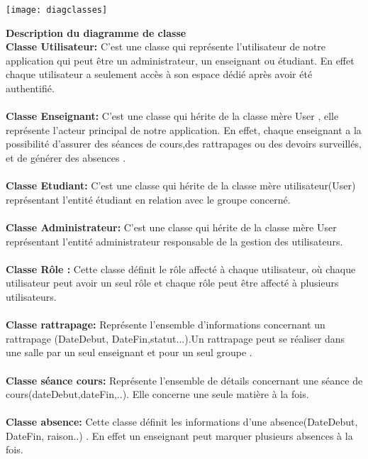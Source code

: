 \documentclass[a4paper,12pt,oneside]{report}
\begin{document}
    \begin{center}
    \hspace*{-0.5cm}
\texttt{[image: diagclasses]}

\label{fig1}
\end{center}
   \textbf{Description du diagramme de classe}\\
\textbf{Classe Utilisateur: }
C'est une classe qui représente l'utilisateur de notre application qui peut être un administrateur, un enseignant ou étudiant. En effet chaque utilisateur a seulement accès  à son espace dédié après avoir été  authentifié.\\
\\
\textbf{Classe Enseignant: }
C'est une classe qui hérite de la classe mère User , elle représente l'acteur principal de notre application. En effet, chaque enseignant a la possibilité d'assurer des séances de cours,des rattrapages ou des devoirs surveillés, et de générer des absences . \\
 \\
\textbf{Classe Etudiant: }
C'est une classe qui hérite de la classe mère utilisateur(User) représentant l'entité étudiant en relation avec le groupe concerné.\\
\\
\textbf{Classe Administrateur: }
 C'est une classe qui hérite de la classe mère User représentant l'entité administrateur  responsable de la gestion des utilisateurs. \\
\\
\textbf{Classe Rôle :}
 Cette classe définit le rôle affecté à chaque utilisateur, où chaque utilisateur peut avoir un seul rôle et chaque rôle peut être affecté à plusieurs utilisateurs. \\
 \\
\textbf{Classe rattrapage: }
 Représente l'ensemble d'informations concernant un rattrapage (DateDebut, DateFin,statut...).Un rattrapage peut se réaliser dans une salle par un seul enseignant et pour un seul groupe .\\
 \\
\textbf{Classe séance cours:} 
Représente l'ensemble de détails concernant une séance de cours(dateDebut,dateFin,..). Elle concerne une seule matière à la fois. \\\\
\textbf{Classe absence: }
Cette classe définit les informations d'une absence(DateDebut, DateFin, raison..) . En effet un enseignant peut marquer plusieurs absences à la fois.\\
\end{document}
